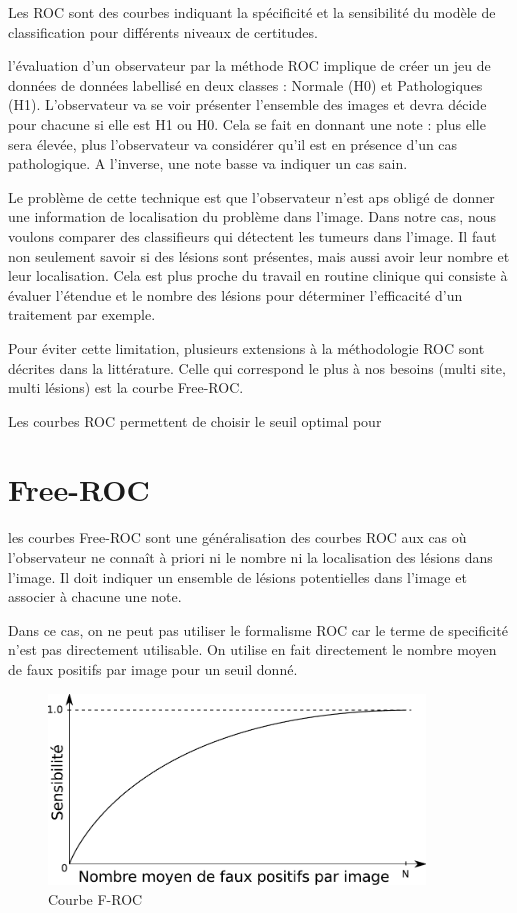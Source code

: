 Les ROC sont des courbes indiquant la spécificité et la sensibilité du modèle de classification pour différents niveaux de certitudes.


l'évaluation d'un observateur par la méthode ROC implique de créer un jeu de données de données labellisé en deux classes : Normale (H0) et Pathologiques (H1). L'observateur va se voir présenter l'ensemble des images et devra décide pour chacune si elle est H1 ou H0. Cela se fait en donnant une note : plus elle sera élevée, plus l'observateur va considérer qu'il est en présence d'un cas pathologique. A l'inverse, une note basse va indiquer un cas sain.

Le problème de cette technique est que l'observateur n'est aps obligé de donner une information de localisation du problème dans l'image. Dans notre cas, nous voulons comparer des classifieurs qui détectent les tumeurs dans l'image. Il faut non seulement savoir si des lésions sont présentes, mais aussi avoir leur nombre et leur localisation. Cela est plus proche du travail en routine clinique qui consiste à évaluer l'étendue et le nombre des lésions pour déterminer l'efficacité d'un traitement par exemple. 

Pour éviter cette limitation, plusieurs extensions à la méthodologie ROC sont décrites dans la littérature. Celle qui correspond le plus à nos besoins (multi site, multi lésions) est la courbe Free-ROC.

Les courbes ROC permettent de choisir le seuil optimal pour 

	\section{Free-ROC}	

les courbes Free-ROC sont une généralisation des courbes ROC aux cas où l'observateur ne connaît à priori ni le nombre ni la localisation des lésions dans l'image. Il doit indiquer un ensemble de lésions potentielles dans l'image et associer à chacune une note.

Dans ce cas, on ne peut pas utiliser le formalisme ROC car le terme de specificité n'est pas directement utilisable. On utilise en fait directement le nombre moyen de faux positifs par image pour un seuil donné.


\begin{figure}[h]
	
	\label{fig:courbeFROC}
	\begin{center}
	\includegraphics[width=10cm]{images/FROC}
	\end{center}
	\caption{Courbe F-ROC}
\end{figure}



